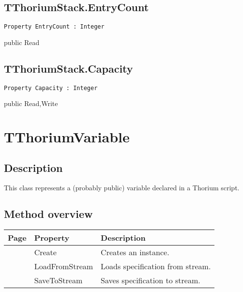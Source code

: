 \subsection{TThoriumStack.EntryCount}
\label{thoriumcorepkg:thorium:tthoriumstack:entrycount}
\begin{FPCList}
\Declaration 

\begin{verbatim}
Property EntryCount : Integer
\end{verbatim}
\Visibility
public
\Access
Read
\end{FPCList}
\subsection{TThoriumStack.Capacity}
\label{thoriumcorepkg:thorium:tthoriumstack:capacity}
\begin{FPCList}
\Declaration 

\begin{verbatim}
Property Capacity : Integer
\end{verbatim}
\Visibility
public
\Access
Read,Write
\end{FPCList}
\section{TThoriumVariable}
\label{thoriumcorepkg:thorium:tthoriumvariable}
\subsection{Description}
This class represents a (probably public) variable declared in a Thorium script.%
\subsection{Method overview}
\label{thoriumcorepkg:thorium:tthoriumvariable:methods}
\begin{tabularx}{\textwidth}{llX}
Page & Property & Description  \\ \hline
\pageref{thoriumcorepkg:thorium:tthoriumvariable:create} & Create  & Creates an instance. \\
\pageref{thoriumcorepkg:thorium:tthoriumvariable:loadfromstream} & LoadFromStream  & Loads specification from stream. \\
\pageref{thoriumcorepkg:thorium:tthoriumvariable:savetostream} & SaveToStream  & Saves specification to stream. \\
\hline
\end{tabularx}
